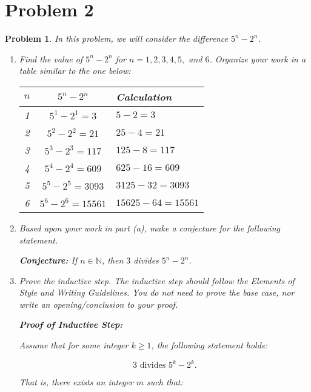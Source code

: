 \documentclass[12pt]{article}
\newtheorem{problem}{Problem}
\theoremstyle{definition}
\begin{document}
\section*{Problem 2}

\begin{problem}
In this problem, we will consider the difference \( 5^n - 2^n \).

\begin{enumerate}[label=(\alph*)]
    \item Find the value of \( 5^n - 2^n \) for \( n = 1, 2, 3, 4, 5, \) and \( 6 \). Organize your work in a table similar to the one below:

    \begin{center}
    \begin{tabular}{|c|c|l|}
    \hline
    \( n \) & \( 5^n - 2^n \) & Calculation \\
    \hline
    1 & \( 5^1 - 2^1 = 3 \) & \( 5 - 2 = 3 \) \\
    2 & \( 5^2 - 2^2 = 21 \) & \( 25 - 4 = 21 \) \\
    3 & \( 5^3 - 2^3 = 117 \) & \( 125 - 8 = 117 \) \\
    4 & \( 5^4 - 2^4 = 609 \) & \( 625 - 16 = 609 \) \\
    5 & \( 5^5 - 2^5 = 3093 \) & \( 3125 - 32 = 3093 \) \\
    6 & \( 5^6 - 2^6 = 15561 \) & \( 15625 - 64 = 15561 \) \\
    \hline
    \end{tabular}
    \end{center}
    
    \item Based upon your work in part (a), make a conjecture for the following statement.

    \textbf{Conjecture:} If \( n \in \mathbb{N} \), then \( 3 \) divides \( 5^n - 2^n \).

    \item Prove the inductive step. The inductive step should follow the Elements of Style and Writing Guidelines. You do not need to prove the base case, nor write an opening/conclusion to your proof.

    \textbf{Proof of Inductive Step:}

    Assume that for some integer \( k \geq 1 \), the following statement holds:

    \[
    3 \text{ divides } 5^k - 2^k.
    \]

    That is, there exists an integer \( m \) such that:


\end{enumerate}
\end{problem}
\end{document}

